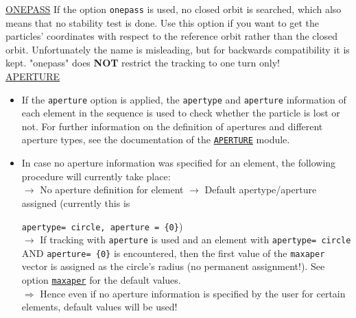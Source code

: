 \begin{description}
\href{track:remarks:onepass:notes}{ONEPASS}
             If the option \texttt{onepass} is used, no closed orbit is searched, which also means 
             that no stability test is done. Use this option if you want to get the particles' coordinates with 
             respect to the reference orbit rather than the closed orbit. Unfortunately the name is misleading, 
             but for backwards compatibility it is kept. "onepass" does \textbf{NOT} restrict the tracking 
             to one turn only!
\\

\href{track:remarks:aperture:notes}{APERTURE}
\begin{itemize}
	\item If the \texttt{aperture} option is applied, the \texttt{apertype} 
                  and \texttt{aperture}
                   information of each element in the sequence is used to check whether the particle is lost or not. 
                   For further information on the definition of apertures and different aperture types, 
                   see the documentation of the \href{../Introduction/aperture.html}{\texttt{APERTURE}}
                   module.
               
	\item In case no aperture information was specified for an element, 
                  the following procedure will currently take place:
\\
                   $\rightarrow$ No aperture definition for element $\rightarrow$ 
                   Default apertype/aperture assigned (currently this is 
                   
\texttt{apertype= circle, aperture = \{0\}}) 
\\ $\rightarrow$  
                   If tracking with \texttt{aperture} is used and an
                   element with 
\texttt{apertype= circle} AND 
\texttt{aperture= \{0\}} 
                   is encountered, then the first value of the \texttt{maxaper} vector
                   is assigned as the circle's radius (no permanent assignment!). 
                   See option \hyperlink{run}{\texttt{maxaper}} for 
                   the default values. 
\\ $\Rightarrow$
                   Hence even if no aperture information is specified by the user for certain elements, 
                   default values will be used!
                
\end{itemize}


\end{description}
